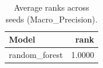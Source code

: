 \begin{table}[t]
\centering
\begin{tabular}{lr}
\toprule
Model & rank \\
\midrule
random_forest & 1.0000 \\
\bottomrule
\end{tabular}
\caption{Average ranks across seeds (Macro_Precision).}
\label{tab:avg_rank_Macro_Precision}
\end{table}